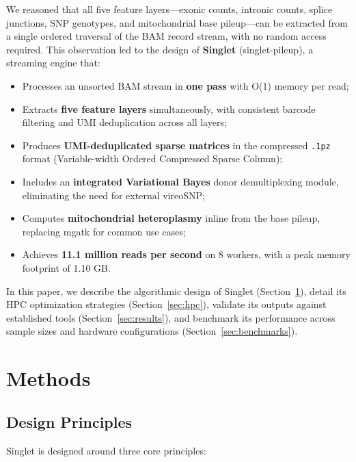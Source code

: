 \documentclass[11pt,a4paper]{article}
\begin{document}
We reasoned that all five feature layers---exonic counts, intronic counts, splice junctions, SNP genotypes, and mitochondrial base pileup---can be extracted from a single ordered traversal of the BAM record stream, with no random access required.
This observation led to the design of \textbf{Singlet} (singlet-pileup), a streaming engine that:

\begin{itemize}
    \item Processes an unsorted BAM stream in \textbf{one pass} with O(1) memory per read;
    \item Extracts \textbf{five feature layers} simultaneously, with consistent barcode filtering and UMI deduplication across all layers;
    \item Produces \textbf{UMI-deduplicated sparse matrices} in the compressed \texttt{.1pz} format (Variable-width Ordered Compressed Sparse Column);
    \item Includes an \textbf{integrated Variational Bayes} donor demultiplexing module, eliminating the need for external vireoSNP;
    \item Computes \textbf{mitochondrial heteroplasmy} inline from the base pileup, replacing mgatk for common use cases;
    \item Achieves \textbf{11.1 million reads per second} on 8 workers, with a peak memory footprint of 1.10 GB.
\end{itemize}

In this paper, we describe the algorithmic design of Singlet (Section~\ref{sec:methods}), detail its HPC optimization strategies (Section~\ref{sec:hpc}), validate its outputs against established tools (Section~\ref{sec:results}), and benchmark its performance across sample sizes and hardware configurations (Section~\ref{sec:benchmarks}).

\section{Methods}\label{sec:methods}

\subsection{Design Principles}

Singlet is designed around three core principles:
\end{document}
